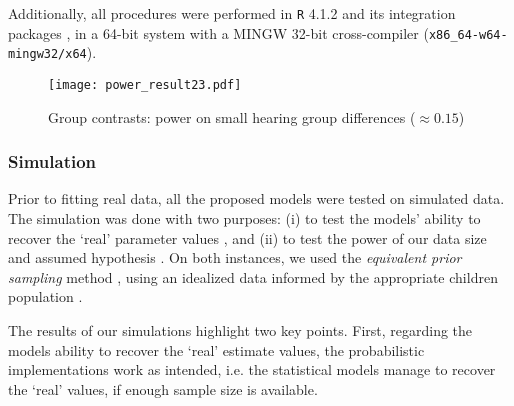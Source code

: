 Additionally, all procedures were performed in \texttt{R} 4.1.2 \citep{R_2015} and its integration packages \citep{RStan_2020}, in a 64-bit system with a MINGW 32-bit cross-compiler (\texttt{x86\_64-w64-mingw32/x64}).

\begin{comment}
	\footnote{see \citet{Rivera_2021} (p. 11-13, 15-27) for a detailed description of its benefits and shortcomings.}
\end{comment}
%
%
\begin{figure}[!h]
	\centering
	\texttt{[image: power\_result23.pdf]}
	\caption[Group contrasts: power on small hearing group differences]{Group contrasts: power on small hearing group differences ($\approx 0.15$)}
	\label{fig:contrasts}
\end{figure}
%
%
\subsubsection{Simulation} \label{ssSA:model_simulation}
%
Prior to fitting real data, all the proposed models were tested on simulated data. The simulation was done with two purposes: (i) to test the models' ability to recover the `real' parameter values \cite{Fogarty_et_al_2022}, and (ii) to test the power of our data size and assumed hypothesis \cite{Kruschke_2015}. On both instances, we used the \textit{equivalent prior sampling} method \cite{Winkler_1967}, using an idealized data informed by the appropriate children population \cite{DeRaeve_2016}. 

\begin{comment}
	Moreover, we tested three goals\footnote{see \citet{Kruschke_2015} chapter 13 for a detailed overview of the method.}: (a) reject the null value of a parameter, (b) affirm a predicted value, and (c) achieve an estimate precision.
\end{comment}

The results of our simulations highlight two key points. First, regarding the models ability to recover the `real' estimate values, the probabilistic implementations work as intended, i.e. the statistical models manage to recover the `real' values, if enough sample size is available. 

